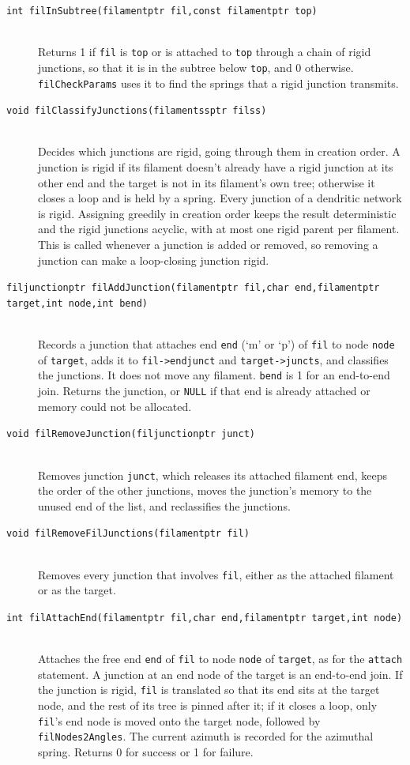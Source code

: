 \documentclass {scrbook}
\newcommand {\ttt} {\texttt}
\begin{document}
\begin{description}
\item[\ttt{int filInSubtree(filamentptr fil,const filamentptr top)}] %
\hfill \\
Returns 1 if \ttt{fil} is \ttt{top} or is attached to \ttt{top} through a chain of rigid junctions, so that it is in the subtree below \ttt{top}, and 0 otherwise. \ttt{filCheckParams} uses it to find the springs that a rigid junction transmits.

\item[\ttt{void filClassifyJunctions(filamentssptr filss)}] %
\hfill \\
Decides which junctions are rigid, going through them in creation order. A junction is rigid if its filament doesn't already have a rigid junction at its other end and the target is not in its filament's own tree; otherwise it closes a loop and is held by a spring. Every junction of a dendritic network is rigid. Assigning greedily in creation order keeps the result deterministic and the rigid junctions acyclic, with at most one rigid parent per filament. This is called whenever a junction is added or removed, so removing a junction can make a loop-closing junction rigid.

\item[\ttt{filjunctionptr filAddJunction(filamentptr fil,char end,filamentptr target,int node,int bend)}] %
\hfill \\
Records a junction that attaches end \ttt{end} (`m' or `p') of \ttt{fil} to node \ttt{node} of \ttt{target}, adds it to \ttt{fil->endjunct} and \ttt{target->juncts}, and classifies the junctions. It does not move any filament. \ttt{bend} is 1 for an end-to-end join. Returns the junction, or \ttt{NULL} if that end is already attached or memory could not be allocated.

\item[\ttt{void filRemoveJunction(filjunctionptr junct)}] %
\hfill \\
Removes junction \ttt{junct}, which releases its attached filament end, keeps the order of the other junctions, moves the junction's memory to the unused end of the list, and reclassifies the junctions.

\item[\ttt{void filRemoveFilJunctions(filamentptr fil)}] %
\hfill \\
Removes every junction that involves \ttt{fil}, either as the attached filament or as the target.

\item[\ttt{int filAttachEnd(filamentptr fil,char end,filamentptr target,int node)}] %
\hfill \\
Attaches the free end \ttt{end} of \ttt{fil} to node \ttt{node} of \ttt{target}, as for the \ttt{attach} statement. A junction at an end node of the target is an end-to-end join. If the junction is rigid, \ttt{fil} is translated so that its end sits at the target node, and the rest of its tree is pinned after it; if it closes a loop, only \ttt{fil}'s end node is moved onto the target node, followed by \ttt{filNodes2Angles}. The current azimuth is recorded for the azimuthal spring. Returns 0 for success or 1 for failure.


\end{description}
\end{document}

